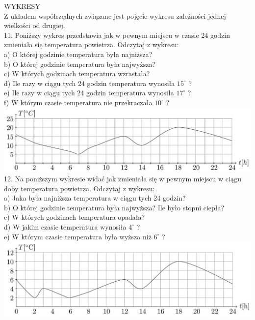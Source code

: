 \documentclass[10pt]{article}
\begin{document}
WYKRESY\\
Z układem współrzędnych związane jest pojęcie wykresu zależności jednej wielkości od drugiej.\\
11. Poniższy wykres przedstawia jak w pewnym miejscu w czasie 24 godzin zmieniała się temperatura powietrza. Odczytaj z wykresu:\\
a) O której godzinie temperatura była najniższa?\\
b) O której godzinie temperatura była najwyższa?\\
c) W których godzinach temperatura wzrastała?\\
d) Ile razy w ciągu tych 24 godzin temperatura wynosiła \(15^{\circ}\) ?\\
e) Ile razy w ciągu tych 24 godzin temperatura wynosiła \(17^{\circ}\) ?\\
f) W którym czasie temperatura nie przekraczała \(10^{\circ}\) ?\\
\includegraphics[max width=\textwidth, center]{2024_11_21_8f01584889ff06348ae7g-071}\\
12. Na poniższym wykresie widać jak zmieniała się w pewnym miejscu w ciągu doby temperatura powietrza. Odczytaj z wykresu:\\
a) Jaka była najniższa temperatura w ciągu tych 24 godzin?\\
b) O której godzinie temperatura była najwyższa? Ile było stopni ciepła?\\
c) W których godzinach temperatura opadała?\\
d) W jakim czasie temperatura wynosiła \(4^{\circ}\) ?\\
e) W którym czasie temperatura była wyższa niż \(6^{\circ}\) ?\\
\includegraphics[max width=\textwidth, center]{2024_11_21_8f01584889ff06348ae7g-072}
\end{document}
